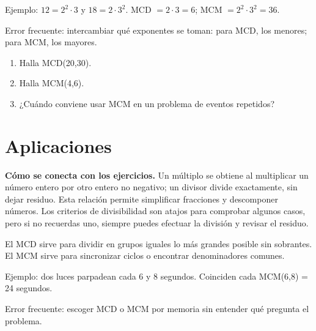 \documentclass[10pt,oneside,openany]{book}
\begin{document}
\begin{ejemplo}
Ejemplo: $12=2^2\cdot3$ y $18=2\cdot3^2$. MCD $=2\cdot3=6$; MCM $=2^2\cdot3^2=36$.
\end{ejemplo}

\begin{ojo}
Error frecuente: intercambiar qué exponentes se toman: para MCD, los menores; para MCM, los mayores.
\end{ojo}

\begin{practica}

\begin{enumerate}

\item Halla MCD(20,30).

\item Halla MCM(4,6).

\item ¿Cuándo conviene usar MCM en un problema de eventos repetidos?

\end{enumerate}

\end{practica}



\section{Aplicaciones}

\textbf{Cómo se conecta con los ejercicios.} Un múltiplo se obtiene al multiplicar un número entero por otro entero no negativo; un divisor divide exactamente, sin dejar residuo. Esta relación permite simplificar fracciones y descomponer números. Los criterios de divisibilidad son atajos para comprobar algunos casos, pero si no recuerdas uno, siempre puedes efectuar la división y revisar el residuo.

El MCD sirve para dividir en grupos iguales lo más grandes posible sin sobrantes. El MCM sirve para sincronizar ciclos o encontrar denominadores comunes.

\begin{ejemplo}
Ejemplo: dos luces parpadean cada 6 y 8 segundos. Coinciden cada MCM(6,8) = 24 segundos.
\end{ejemplo}

\begin{ojo}
Error frecuente: escoger MCD o MCM por memoria sin entender qué pregunta el problema.
\end{ojo}
\end{document}
